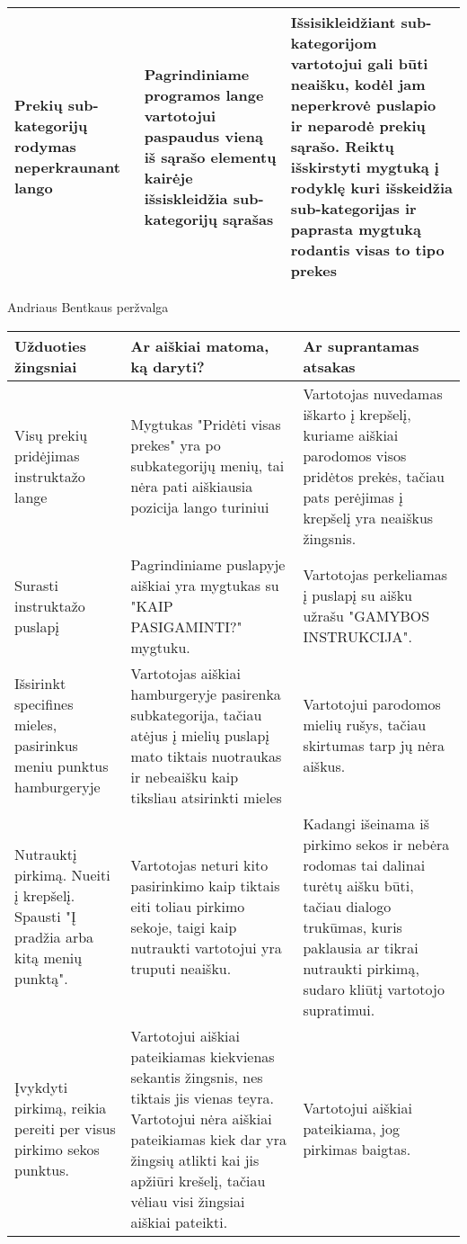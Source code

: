 \documentclass[oneside]{VUMIFPSkursinis}
\begin{document}
\begin{center}
\begin{tabular}{ |p{4cm}| p{6cm} | p{7cm} | }
	Prekių sub-kategorijų rodymas neperkraunant lango & Pagrindiniame programos lange vartotojui paspaudus vieną iš sąrašo elementų kairėje išsiskleidžia sub-kategorijų sąrašas & Išsisikleidžiant sub-kategorijom vartotojui gali būti neaišku, kodėl jam neperkrovė puslapio ir neparodė prekių sąrašo. Reiktų išskirstyti mygtuką į rodyklę kuri išskeidžia sub-kategorijas ir paprasta mygtuką rodantis visas to tipo prekes \\ \hline

   \hline
    \end{tabular}
\end{center}

\pagebreak
Andriaus Bentkaus peržvalga
\begin{center}
	\begin{tabular}{ |p{3cm}| p{6cm} | p{8cm} | }
		\hline
		Užduoties žingsniai & Ar aiškiai matoma, ką daryti? & Ar suprantamas atsakas \\ \hline

		Visų prekių pridėjimas instruktažo lange &
		Mygtukas "Pridėti visas prekes" yra po subkategorijų menių, tai nėra pati aiškiausia pozicija lango turiniui &
		Vartotojas nuvedamas iškarto į krepšelį, kuriame aiškiai parodomos visos pridėtos prekės, tačiau pats perėjimas į krepšelį yra neaiškus žingsnis.
		\\ \hline

		Surasti instruktažo puslapį &
		Pagrindiniame puslapyje aiškiai yra mygtukas su "KAIP PASIGAMINTI?" mygtuku. &
		Vartotojas perkeliamas į puslapį su aišku užrašu "GAMYBOS INSTRUKCIJA".
		\\ \hline

		Išsirinkt specifines mieles, pasirinkus meniu punktus hamburgeryje &
		Vartotojas aiškiai hamburgeryje pasirenka subkategorija, tačiau atėjus į mielių puslapį mato tiktais nuotraukas ir nebeaišku kaip tiksliau atsirinkti mieles &
		Vartotojui parodomos mielių rušys, tačiau skirtumas tarp jų nėra aiškus.
		\\ \hline

		Nutrauktį pirkimą.
		Nueiti į krepšelį.
		Spausti "Į pradžia arba kitą menių punktą". &
		Vartotojas neturi kito pasirinkimo kaip tiktais eiti toliau pirkimo sekoje, taigi kaip nutraukti vartotojui yra truputi neaišku. &
		Kadangi išeinama iš pirkimo sekos ir nebėra rodomas tai dalinai turėtų aišku būti, tačiau dialogo trukūmas, kuris paklausia ar tikrai nutraukti pirkimą, sudaro kliūtį vartotojo supratimui.
		\\ \hline

		Įvykdyti pirkimą, reikia pereiti per visus pirkimo sekos punktus. &
		Vartotojui aiškiai pateikiamas kiekvienas sekantis žingsnis, nes tiktais jis vienas teyra. Vartotojui nėra aiškiai pateikiamas kiek dar yra žingsių atlikti kai jis apžiūri krešelį, tačiau vėliau visi žingsiai aiškiai pateikti. &
		Vartotojui aiškiai pateikiama, jog pirkimas baigtas.
		\\ \hline
	\end{tabular}
\end{center}
\end{document}
